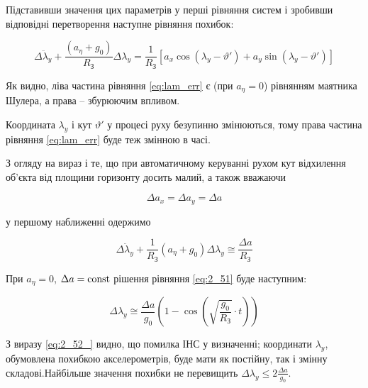 Підставивши значення цих параметрів у перші рівняння систем і зробивши відповідні перетворення наступне рівняння похибок:

\begin{equation} 
\label{eq:lam_err} 
\Delta \ddot{\lambda }_{y} +\frac{(a_{\eta } +g_{0} )}{R_{{\text{З}}} } 
\Delta \lambda _{y} =\frac{1}{R_{{\text{З}}} } \left[a_{x} \cos (\lambda _{y} -\vartheta ')+a_{y} \sin (\lambda _{y} -
\vartheta ')\right] 
\end{equation} 

Як видно, ліва частина рівняння \eqref{eq:lam_err} є (при $a_{\eta } =0$) рівнянням маятника Шулера, а права -- збурюючим впливом.

Координата $\lambda _{y} $ і кут $\vartheta '$ у процесі руху безупинно змінюються, тому права частина рівняння \eqref{eq:lam_err} 
буде теж змінною в часі.

З огляду на вираз і те, що при автоматичному керуванні рухом кут відхилення об'єкта від площини горизонту досить малий, а також вважаючи

\[\Delta a_{x} =\Delta a_{y} =\Delta a\] 

у першому наближенні одержимо

\begin{equation} 
\label{eq:2_51} 
\Delta \ddot{\lambda }_{y} +\frac{1}{R_{{\text{З}}} } (a_{\eta } +g_{0} )\Delta \lambda _{y} \cong \frac{\Delta a}{R_{{\text{З}}} }  
\end{equation} 

При $a_{\eta } =0$, $\Delta a={\rm const}$ рішення рівняння \eqref{eq:2_51} буде наступним:

\begin{equation} 
\label{eq:2_52_} 
\Delta \lambda _{y} \cong \frac{\Delta a}{g_{0} } \left(1-\cos \left(\sqrt{\frac{g_{0} }{R_{{\text{З}}} } } \cdot t\right)\right) 
\end{equation} 

З виразу \eqref{eq:2_52_} видно, що помилка ІНС у визначенні; координати $\lambda _{y} $, обумовлена похибкою акселерометрів, 
буде мати як постійну, так і змінну складові.Найбільше значення похибки не перевищить  $\Delta \lambda _{y} \le 2\frac{\Delta a}{g_{0} } $. 




